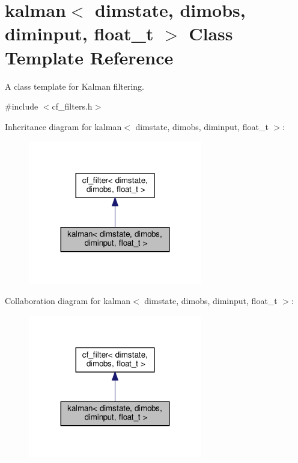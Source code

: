 \hypertarget{classkalman}{}\section{kalman$<$ dimstate, dimobs, diminput, float\+\_\+t $>$ Class Template Reference}
\label{classkalman}


A class template for Kalman filtering.  




{\ttfamily \#include $<$cf\+\_\+filters.\+h$>$}



Inheritance diagram for kalman$<$ dimstate, dimobs, diminput, float\+\_\+t $>$\+:
\nopagebreak
\begin{figure}[H]
\begin{center}
\leavevmode
\includegraphics[width=215pt]{classkalman__inherit__graph}
\end{center}
\end{figure}


Collaboration diagram for kalman$<$ dimstate, dimobs, diminput, float\+\_\+t $>$\+:
\nopagebreak
\begin{figure}[H]
\begin{center}
\leavevmode
\includegraphics[width=215pt]{classkalman__coll__graph}
\end{center}
\end{figure}
